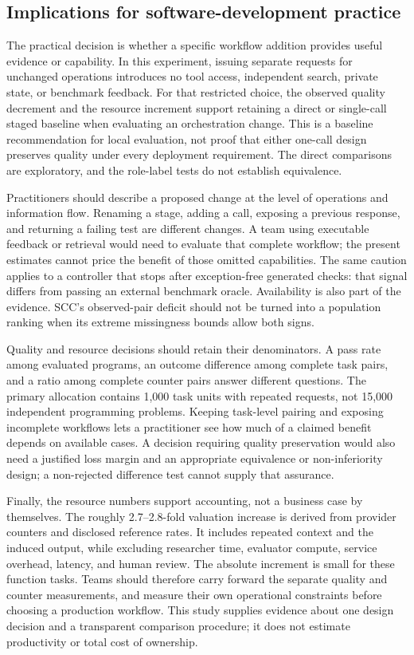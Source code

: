 \subsection{Implications for software-development practice}
The practical decision is whether a specific workflow addition provides useful evidence or capability. In this experiment, issuing separate requests for unchanged operations introduces no tool access, independent search, private state, or benchmark feedback. For that restricted choice, the observed quality decrement and the resource increment support retaining a direct or single-call staged baseline when evaluating an orchestration change. This is a baseline recommendation for local evaluation, not proof that either one-call design preserves quality under every deployment requirement. The direct comparisons are exploratory, and the role-label tests do not establish equivalence.

Practitioners should describe a proposed change at the level of operations and information flow. Renaming a stage, adding a call, exposing a previous response, and returning a failing test are different changes. A team using executable feedback or retrieval would need to evaluate that complete workflow; the present estimates cannot price the benefit of those omitted capabilities. The same caution applies to a controller that stops after exception-free generated checks: that signal differs from passing an external benchmark oracle. Availability is also part of the evidence. SCC's observed-pair deficit should not be turned into a population ranking when its extreme missingness bounds allow both signs.

Quality and resource decisions should retain their denominators. A pass rate among evaluated programs, an outcome difference among complete task pairs, and a ratio among complete counter pairs answer different questions. The primary allocation contains 1,000 task units with repeated requests, not 15,000 independent programming problems. Keeping task-level pairing and exposing incomplete workflows lets a practitioner see how much of a claimed benefit depends on available cases. A decision requiring quality preservation would also need a justified loss margin and an appropriate equivalence or non-inferiority design; a non-rejected difference test cannot supply that assurance.

Finally, the resource numbers support accounting, not a business case by themselves. The roughly 2.7--2.8-fold valuation increase is derived from provider counters and disclosed reference rates. It includes repeated context and the induced output, while excluding researcher time, evaluator compute, service overhead, latency, and human review. The absolute increment is small for these function tasks. Teams should therefore carry forward the separate quality and counter measurements, and measure their own operational constraints before choosing a production workflow. This study supplies evidence about one design decision and a transparent comparison procedure; it does not estimate productivity or total cost of ownership.


